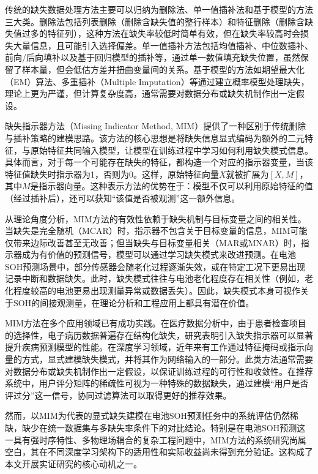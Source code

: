 \documentclass[10pt,a4paper]{ctexart}
\begin{document}
传统的缺失数据处理方法主要可以归纳为删除法、单一值插补法和基于模型的方法三大类。删除法包括列表删除（删除含缺失值的整行样本）和特征删除（删除含缺失值过多的特征列），这种方法在缺失率较低时简单有效，但在缺失率较高时会损失大量信息，且可能引入选择偏差。单一值插补方法包括均值插补、中位数插补、前向/后向填补以及基于回归模型的插补等，通过单一数值填充缺失位置，虽然保留了样本量，但会低估方差并扭曲变量间的关系。基于模型的方法如期望最大化（EM）算法、多重插补（Multiple Imputation）等通过建立概率模型处理缺失，理论上更为严谨，但计算复杂度高，通常需要对数据分布或缺失机制作出一定假设。

缺失指示器方法（Missing Indicator Method, MIM）提供了一种区别于传统删除与插补策略的建模思路\cite{jones1996indicator,van2023missing}。该方法的核心思想是将缺失信息显式编码为额外的二元特征，与原始特征共同输入模型，让模型在训练过程中学习如何利用缺失模式信息\cite{ipsen2022deal}。具体而言，对于每一个可能存在缺失的特征，都构造一个对应的指示器变量，当该特征值缺失时指示器为1，否则为0。这样，原始特征向量$X$就被扩展为$[X, M]$，其中$M$是指示器向量。这种表示方法的优势在于：模型不仅可以利用原始特征的值（经过插补后），还可以获知“该值是否被观测”这一额外信息。

从理论角度分析，MIM方法的有效性依赖于缺失机制与目标变量之间的相关性。当缺失是完全随机（MCAR）时，指示器不包含关于目标变量的信息，MIM可能仅带来边际改善甚至无改善；但当缺失与目标变量相关（MAR或MNAR）时，指示器成为有价值的预测信号，模型可以通过学习缺失模式来改进预测。在电池SOH预测场景中，部分传感器会随老化过程逐渐失效，或在特定工况下更易出现记录中断和数据缺失。此时，缺失模式往往与电池老化程度存在相关性（例如，老化程度较高的电池更易出现测量异常或数据丢失）。因此，缺失模式本身可视作关于SOH的间接观测量，在理论分析和工程应用上都具有潜在价值。

MIM方法在多个应用领域已有成功实践。在医疗数据分析中，由于患者检查项目的选择性，电子病历数据普遍存在结构化缺失，研究表明引入缺失指示器可以显著提升疾病预测模型的性能\cite{sisk2023imputation,ehrig2025imputation}。在深度学习领域，近年来有工作通过特征掩码或指示向量的方式，显式建模缺失模式，并将其作为网络输入的一部分\cite{ipsen2022deal,che2018recurrent}。此类方法通常需要对数据分布或缺失机制作出一定假设，以保证训练过程的可行性和收敛性。在推荐系统中，用户评分矩阵的稀疏性可视为一种特殊的数据缺失，通过建模“用户是否评过分”这一信号，协同过滤算法可以取得更好的推荐效果。

然而，以MIM为代表的显式缺失建模在电池SOH预测任务中的系统评估仍然稀缺，缺少在统一数据集与多缺失率条件下的对比结论。特别是在电池SOH预测这一具有强时序特性、多物理场耦合的复杂工程问题中，MIM方法的系统研究尚属空白，其在不同深度学习架构下的适用性和实际收益尚未得到充分验证。这构成了本文开展实证研究的核心动机之一。
\end{document}
